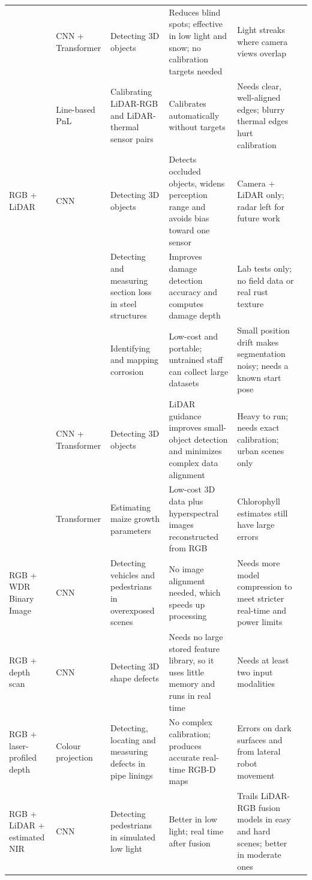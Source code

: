 {\begin{xltabular}{\textwidth}{>{\RaggedRight\arraybackslash}p{1.6cm}>{\RaggedRight\arraybackslash}p{2.2cm}>{\RaggedRight\arraybackslash}p{2.3cm}>{\RaggedRight\arraybackslash}X>{\RaggedRight\arraybackslash}Xp{0.95cm}}
 & CNN + Transformer & Detecting 3D objects & Reduces blind spots; effective in low light and snow; no calibration targets needed & Light streaks where camera views overlap & \citep{Tran2025} \\
 & Line-based PnL & Calibrating LiDAR-RGB and LiDAR-thermal sensor pairs & Calibrates automatically without targets & Needs clear, well-aligned edges; blurry thermal edges hurt calibration & \citep{Yang2024} \\
\midrule
RGB + LiDAR & CNN & Detecting 3D objects & Detects occluded objects, widens perception range and avoids bias toward one sensor & Camera + LiDAR only; radar left for future work & \citep{Zhang2026d} \\
 &  & Detecting and measuring section loss in steel structures & Improves damage detection accuracy and computes damage depth & Lab tests only; no field data or real rust texture & \citep{Maru2025} \\
 &  & Identifying and mapping corrosion & Low-cost and portable; untrained staff can collect large datasets & Small position drift makes segmentation noisy; needs a known start pose & \citep{PimenteldeFigueiredo2025} \\
 & CNN + Transformer & Detecting 3D objects & LiDAR guidance improves small-object detection and minimizes complex data alignment & Heavy to run; needs exact calibration; urban scenes only & \citep{Cheng2025} \\
 & Transformer & Estimating maize growth parameters & Low-cost 3D data plus hyperspectral images reconstructed from RGB & Chlorophyll estimates still have large errors & \citep{Tang2025} \\
\midrule
RGB + WDR Binary Image & CNN & Detecting vehicles and pedestrians in overexposed scenes & No image alignment needed, which speeds up processing & Needs more model compression to meet stricter real-time and power limits & \citep{Byeon2026} \\
\midrule
RGB + depth scan & CNN & Detecting 3D shape defects & Needs no large stored feature library, so it uses little memory and runs in real time & Needs at least two input modalities & \citep{Asad2026} \\
\midrule
RGB + laser-profiled depth & Colour projection & Detecting, locating and measuring defects in pipe linings & No complex calibration; produces accurate real-time RGB-D maps & Errors on dark surfaces and from lateral robot movement & \citep{Gunatilake2021} \\
\midrule
RGB + LiDAR + estimated NIR & CNN & Detecting pedestrians in simulated low light & Better in low light; real time after fusion & Trails LiDAR-RGB fusion models in easy and hard scenes; better in moderate ones & \citep{Wu2025} \\

\end{xltabular}}
